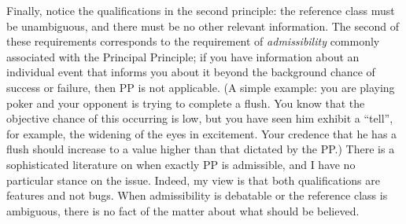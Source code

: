 \documentclass[letterpaper,12pt]{article}
\begin{document}
Finally, notice the qualifications in the second principle: the reference class must be unambiguous, and there must be no other relevant information. The second of these requirements corresponds to the requirement of \emph{admissibility} commonly associated with the Principal Principle; if you have information about an individual event that informs you about it beyond the background chance of success or failure, then PP is not applicable. (A simple example: you are playing poker and your opponent is trying to complete a flush. You know that the objective chance of this occurring is low, but you have seen him exhibit a ``tell'', for example, the widening of the eyes in excitement. Your credence that he has a flush should increase to a value higher than that dictated by the PP.) There is a sophisticated literature on when exactly PP is admissible, and I have no particular stance on the issue. Indeed, my view is that both qualifications are features and not bugs. When admissibility is debatable or the reference class is ambiguous, there is no fact of the matter about what should be believed.
\end{document}
